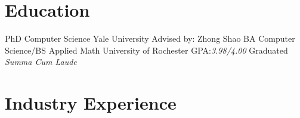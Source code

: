 \documentclass[10pt,letterpaper,sans]{moderncv}
\begin{document}
\newcommand{\about}{\raisebox{0.25ex}{\scalebox{0.7}{$\sim$}}}
\newcommand{\ormore}{\raisebox{0.25ex}{+}}

\renewcommand*{\namefont}{\fontsize{20}{24}\mdseries\upshape}
\makecvtitle{}
\vspace{-1cm}

\section{Education}

        {PhD Computer Science}
        {Yale University}
        {}
        {}
        {Advised by: Zhong Shao}
        {BA Computer Science/BS Applied Math}
        {University of Rochester}
        {}
        {GPA:\@ \textit{3.98/4.00}}
        {Graduated \textit{Summa Cum Laude}}

\section{Industry Experience}
\end{document}
